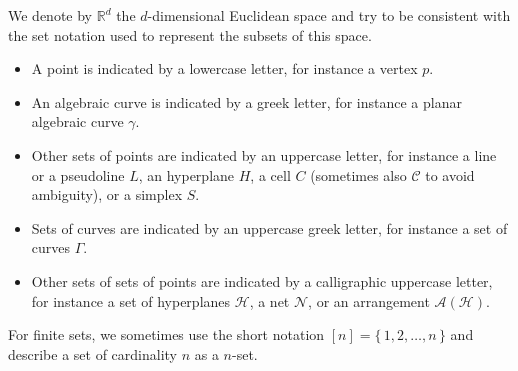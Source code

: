 We denote by \(\mathbb{R}^d\) the \(d\)-dimensional Euclidean space
and try to be consistent with the set notation used to represent the subsets
of this space.
\begin{itemize}
	\item A point is indicated by a lowercase letter, for instance a vertex \(p\).
	\item An algebraic curve is indicated by a greek letter, for instance
		a planar algebraic curve \(\gamma\).
	\item Other sets of points are indicated by an uppercase letter, for instance
		a line or a pseudoline \(L\),
		an hyperplane \(H\),
		a cell \(C\) (sometimes also \(\mathcal{C}\) to avoid ambiguity),
		or a simplex \(S\).
	\item Sets of curves are indicated by an uppercase greek letter, for
		instance
		a set of curves \(\Gamma\).
	\item Other sets of sets of points are indicated by a calligraphic uppercase
		letter, for instance
		a set of hyperplanes \(\mathcal{H}\),
		a net \(\mathcal{N}\), or an arrangement \(\mathcal{A}(\mathcal{H})\).
\end{itemize}

For finite sets,
we sometimes use the short notation \([n] = \{\,1,2,\ldots ,n\,\}\) and
describe a set of cardinality \(n\) as a \(n\)-set.

